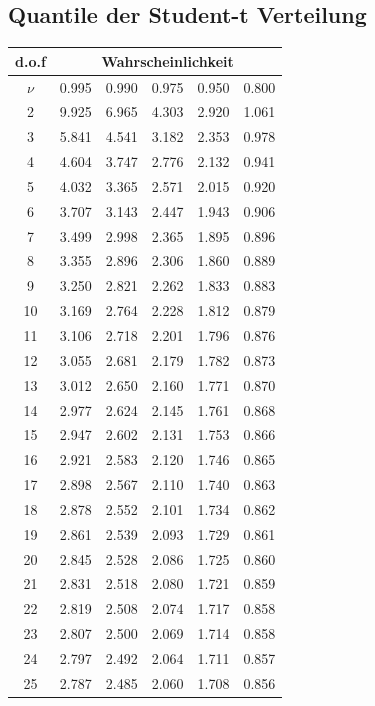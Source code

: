 \subsection{Quantile der Student-t Verteilung}
\begin{tabular}{c||c|c|c|c|c|}
d.o.f & \multicolumn{5}{c|}{Wahrscheinlichkeit}\\
\hline
$\nu$ & 0.995 & 0.990 & 0.975 & 0.950 & 0.800 \\ 
\hline\hline
2 & 9.925 & 6.965 & 4.303 & 2.920 & 1.061 \\ 
\hline
3 & 5.841 & 4.541 & 3.182 & 2.353 & 0.978 \\ 
\hline
4 & 4.604 & 3.747 & 2.776 & 2.132 & 0.941 \\ 
\hline
5 & 4.032 & 3.365 & 2.571 & 2.015 & 0.920 \\ 
\hline
6 & 3.707 & 3.143 & 2.447 & 1.943 & 0.906 \\ 
\hline
7 & 3.499 & 2.998 & 2.365 & 1.895 & 0.896 \\ 
\hline
8 & 3.355 & 2.896 & 2.306 & 1.860 & 0.889 \\ 
\hline
9 & 3.250 & 2.821 & 2.262 & 1.833 & 0.883 \\ 
\hline
10 & 3.169 & 2.764 & 2.228 & 1.812 & 0.879 \\ 
\hline
11 & 3.106 & 2.718 & 2.201 & 1.796 & 0.876 \\ 
\hline
12 & 3.055 & 2.681 & 2.179 & 1.782 & 0.873 \\ 
\hline
13 & 3.012 & 2.650 & 2.160 & 1.771 & 0.870 \\ 
\hline
14 & 2.977 & 2.624 & 2.145 & 1.761 & 0.868 \\ 
\hline
15 & 2.947 & 2.602 & 2.131 & 1.753 & 0.866 \\ 
\hline
16 & 2.921 & 2.583 & 2.120 & 1.746 & 0.865 \\ 
\hline
17 & 2.898 & 2.567 & 2.110 & 1.740 & 0.863 \\ 
\hline
18 & 2.878 & 2.552 & 2.101 & 1.734 & 0.862 \\ 
\hline
19 & 2.861 & 2.539 & 2.093 & 1.729 & 0.861 \\ 
\hline
20 & 2.845 & 2.528 & 2.086 & 1.725 & 0.860 \\ 
\hline
21 & 2.831 & 2.518 & 2.080 & 1.721 & 0.859 \\ 
\hline
22 & 2.819 & 2.508 & 2.074 & 1.717 & 0.858 \\ 
\hline
23 & 2.807 & 2.500 & 2.069 & 1.714 & 0.858 \\ 
\hline
24 & 2.797 & 2.492 & 2.064 & 1.711 & 0.857 \\ 
\hline
25 & 2.787 & 2.485 & 2.060 & 1.708 & 0.856 \\ 
\hline
\end{tabular}
